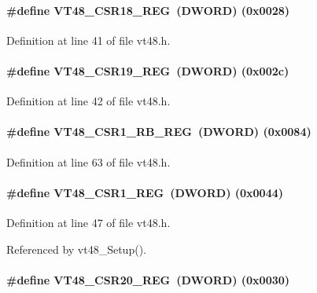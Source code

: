 \paragraph[{VT48\_\-CSR18\_\-REG}]{\setlength{\rightskip}{0pt plus 5cm}\#define VT48\_\-CSR18\_\-REG~({\bf DWORD}) (0x0028)}\hfill\label{vt48_8h_a71ed96e19560a9b6e1ae80a8db74626b}


Definition at line 41 of file vt48.h.
\paragraph[{VT48\_\-CSR19\_\-REG}]{\setlength{\rightskip}{0pt plus 5cm}\#define VT48\_\-CSR19\_\-REG~({\bf DWORD}) (0x002c)}\hfill\label{vt48_8h_a5f0066a60127b1ea1b89a0ae878ec255}


Definition at line 42 of file vt48.h.
\paragraph[{VT48\_\-CSR1\_\-RB\_\-REG}]{\setlength{\rightskip}{0pt plus 5cm}\#define VT48\_\-CSR1\_\-RB\_\-REG~({\bf DWORD}) (0x0084)}\hfill\label{vt48_8h_a6db1abedeae1b15a2d93dd5844602c05}


Definition at line 63 of file vt48.h.
\paragraph[{VT48\_\-CSR1\_\-REG}]{\setlength{\rightskip}{0pt plus 5cm}\#define VT48\_\-CSR1\_\-REG~({\bf DWORD}) (0x0044)}\hfill\label{vt48_8h_a4dfe499498af9175352f1a2c8e425065}


Definition at line 47 of file vt48.h.

Referenced by vt48\_\-Setup().
\paragraph[{VT48\_\-CSR20\_\-REG}]{\setlength{\rightskip}{0pt plus 5cm}\#define VT48\_\-CSR20\_\-REG~({\bf DWORD}) (0x0030)}\hfill\label{vt48_8h_ac1d54b8cb7c6da68de40c976097d7b42}


